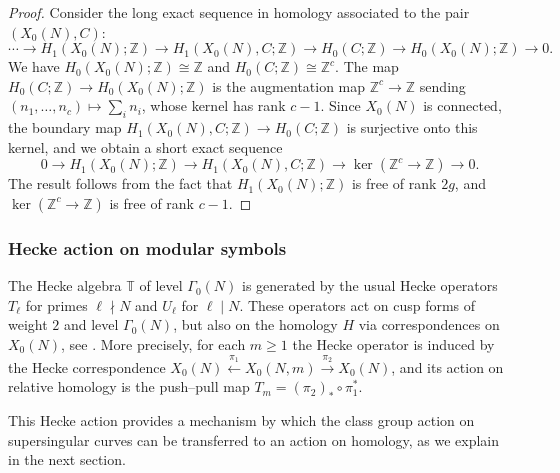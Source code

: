 \documentclass[10pt]{amsart}
\theoremstyle{theostyle}
\newcommand{\ZZ}{\mathbb{Z}}
\begin{document}
\begin{proof}
	Consider the long exact sequence in homology associated to the pair
	$(X_0(N), C)$:
	\[
	\cdots \to H_1(X_0(N);\ZZ) \to H_1(X_0(N),C;\ZZ)
	\to H_0(C;\ZZ) \to H_0(X_0(N);\ZZ) \to 0.
	\]
	We have $H_0(X_0(N);\ZZ)\cong \ZZ$ and $H_0(C;\ZZ)\cong \ZZ^c$. The map
	$H_0(C;\ZZ)\to H_0(X_0(N);\ZZ)$ is the augmentation map
	$\ZZ^c \to \ZZ$ sending $(n_1,\dots,n_c)\mapsto \sum_i n_i$, whose kernel has
	rank $c-1$. Since $X_0(N)$ is connected, the boundary map
	$H_1(X_0(N),C;\ZZ)\to H_0(C;\ZZ)$ is surjective onto this kernel, and we obtain
	a short exact sequence
	\[
	0 \to H_1(X_0(N);\ZZ) \to H_1(X_0(N),C;\ZZ) \to \ker(\ZZ^c\to\ZZ) \to 0.
	\]
	The result follows from the fact that $H_1(X_0(N);\ZZ)$ is free of rank $2g$, and $\ker(\ZZ^c\to\ZZ)$ is free of
	rank $c-1$.
\end{proof}


\subsubsection*{Hecke action on modular symbols} The Hecke algebra $\mathbb T$ of level $\Gamma_0(N)$ is generated by the
usual Hecke operators $T_\ell$ for primes $\ell\nmid N$ and $U_\ell$ for
$\ell\mid N$. These operators act on cusp forms of weight $2$ and level
$\Gamma_0(N)$, but also on the homology $H$ via correspondences on
$X_0(N)$, see \cite[\S 2.4]{Cremona:Algorithms}. More precisely, for each $m\ge1$ the Hecke operator is induced by the Hecke
correspondence $X_0(N)\xleftarrow{\pi_1}X_0(N,m)\xrightarrow{\pi_2}X_0(N)$,
and its action on relative homology is the push--pull map
$T_m=(\pi_2)_*\circ\pi_1^*$.


This Hecke action %
	provides a mechanism by which the class group action on supersingular
	curves %
	can be transferred to
	an action on homology, as we explain in the next section.
\end{document}
